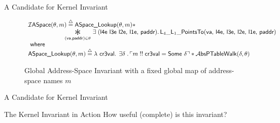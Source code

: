 \documentclass[aspectratio=169,xcolor=dvipsnames]{beamer}
\newcommand{\gammaPred}{\delta}
\newcommand{\ptableabswalk}[1]{\mathcal{A}\textsf{bsPTableWalk}(#1)}
\newcommand{\ptablestore}{\theta}
\begin{document}
\begin{frame}{A Candidate for Kernel Invariant}
     \begin{figure}
  \scriptsize
\centerline{$
\begin{array}{l}
  \mathcal{I}\textsf{ASpace}(\ptablestore,m)\stackrel{\triangle}{=} \textsf{ASpace\_Lookup}(\ptablestore,m) \ast \\
 \qquad\qquad\qquad \bigast{(\vaddr, \textsf{paddr})\in \ptablestore}{\exists\;(\textsf{l4e l3e l2e, l1e, paddr})\ldotp \textsf{L}_{4}\_\textsf{L}_{1}\_\textsf{PointsTo}(\vaddr\textsf{, l4e, l3e, l2e, l1e, paddr})} \\
  \textsf{ where } \\
   \textsf{ASpace\_Lookup} (\ptablestore,m) \stackrel{\triangle}{=} \lambda\textsf{ cr3val} \ldotp \; \exists \gammaPred \; \ldotp \ulcorner m \; !!\; \textsf{cr3val} = \textsf{Some } \gammaPred \urcorner \ast
    \ptableabswalk{\delta,\theta}
\end{array}
$}
\caption{Global Address-Space Invariant with a fixed global map of address-space names $m$}
  \label{fig:peraspaceinvariant}
  \end{figure}
\end{frame}
\begin{frame}{A Candidate for Kernel Invariant}
    \begin{alertblock}{The Kernel Invariant in Action}
    How useful (complete) is this invariant?
    \end{alertblock}
\end{frame}
\end{document}
